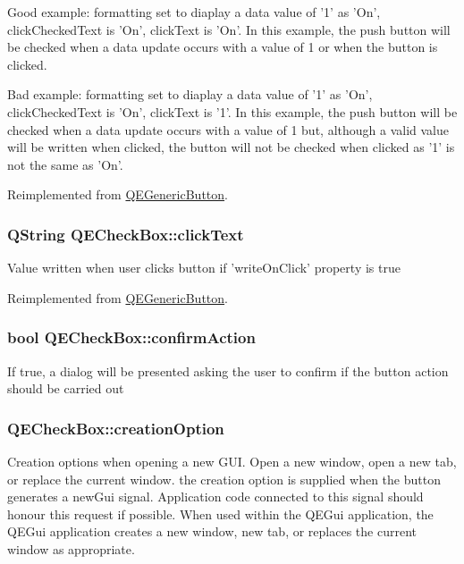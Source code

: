 Good example: formatting set to diaplay a data value of '1' as 'On', clickCheckedText is 'On', clickText is 'On'. In this example, the push button will be checked when a data update occurs with a value of 1 or when the button is clicked.

Bad example: formatting set to diaplay a data value of '1' as 'On', clickCheckedText is 'On', clickText is '1'. In this example, the push button will be checked when a data update occurs with a value of 1 but, although a valid value will be written when clicked, the button will not be checked when clicked as '1' is not the same as 'On'. 

Reimplemented from \hyperlink{classQEGenericButton}{QEGenericButton}.

\hypertarget{classQECheckBox_ab31f93b7e07ba016b28526647891d1c2}{
\subsubsection[{clickText}]{\setlength{\rightskip}{0pt plus 5cm}QString QECheckBox::clickText}}
\label{classQECheckBox_ab31f93b7e07ba016b28526647891d1c2}
Value written when user clicks button if 'writeOnClick' property is true 

Reimplemented from \hyperlink{classQEGenericButton}{QEGenericButton}.

\hypertarget{classQECheckBox_a7f332a10d02872f2435fae04bbd72c67}{
\subsubsection[{confirmAction}]{\setlength{\rightskip}{0pt plus 5cm}bool QECheckBox::confirmAction}}
\label{classQECheckBox_a7f332a10d02872f2435fae04bbd72c67}
If true, a dialog will be presented asking the user to confirm if the button action should be carried out \hypertarget{classQECheckBox_af6144bd9c21911595b96c8a56913d953}{
\subsubsection[{creationOption}]{ QECheckBox::creationOption}}
\label{classQECheckBox_af6144bd9c21911595b96c8a56913d953}
Creation options when opening a new GUI. Open a new window, open a new tab, or replace the current window. the creation option is supplied when the button generates a newGui signal. Application code connected to this signal should honour this request if possible. When used within the QEGui application, the QEGui application creates a new window, new tab, or replaces the current window as appropriate. 

